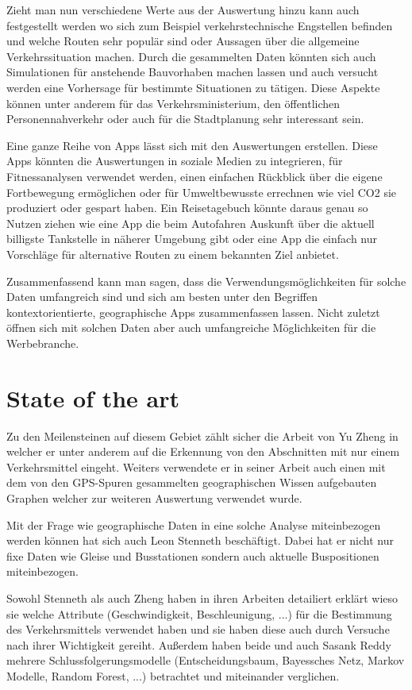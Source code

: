 Zieht man nun verschiedene Werte aus der Auswertung hinzu kann auch festgestellt werden wo sich zum Beispiel verkehrstechnische Engstellen befinden und welche Routen sehr populär sind oder Aussagen über die allgemeine Verkehrssituation machen. Durch die gesammelten Daten könnten sich auch Simulationen für anstehende Bauvorhaben machen lassen und auch versucht werden eine Vorhersage für bestimmte Situationen zu tätigen. Diese Aspekte können unter anderem für das Verkehrsministerium,  den öffentlichen Personennahverkehr oder auch für die Stadtplanung sehr interessant sein.

Eine ganze Reihe von Apps lässt sich mit den Auswertungen erstellen. Diese Apps könnten die Auswertungen in soziale Medien zu integrieren, für Fitnessanalysen verwendet werden, einen einfachen Rückblick über die eigene Fortbewegung ermöglichen oder für Umweltbewusste errechnen wie viel CO2 sie produziert oder gespart haben. Ein Reisetagebuch könnte daraus genau so Nutzen ziehen wie eine App die beim Autofahren Auskunft über die aktuell billigste Tankstelle in näherer Umgebung gibt oder eine App die einfach nur Vorschläge für alternative Routen zu einem bekannten Ziel anbietet.

Zusammenfassend kann man sagen, dass die Verwendungsmöglichkeiten für solche Daten umfangreich sind und sich am besten unter den Begriffen kontextorientierte, geographische Apps zusammenfassen lassen. Nicht zuletzt öffnen sich mit solchen Daten aber auch umfangreiche Möglichkeiten für die Werbebranche.

\section{State of the art}
Zu den Meilensteinen auf diesem Gebiet zählt sicher die Arbeit von Yu Zheng in welcher er unter anderem auf die Erkennung von den Abschnitten mit nur einem Verkehrsmittel eingeht. Weiters verwendete er in seiner Arbeit auch einen mit dem von den GPS-Spuren gesammelten geographischen Wissen aufgebauten Graphen welcher zur weiteren Auswertung verwendet wurde.\cite{zheng_understanding_2010}

Mit der Frage wie geographische Daten in eine solche Analyse miteinbezogen werden können hat sich auch  Leon Stenneth beschäftigt. Dabei hat er nicht nur fixe Daten wie Gleise und Busstationen sondern auch aktuelle Buspositionen miteinbezogen. \cite{stenneth_transportation_2011}

Sowohl Stenneth als auch Zheng haben in ihren Arbeiten detailiert erklärt wieso sie welche Attribute (Geschwindigkeit, Beschleunigung, ...) für die Bestimmung des Verkehrsmittels verwendet haben und sie haben diese auch durch Versuche nach ihrer Wichtigkeit gereiht. Außerdem haben beide und auch Sasank Reddy mehrere Schlussfolgerungsmodelle (Entscheidungsbaum, Bayessches Netz, Markov Modelle, Random Forest, ...) betrachtet und miteinander verglichen. \cite{reddy_using_2010, stenneth_transportation_2011, zheng_understanding_2010}

